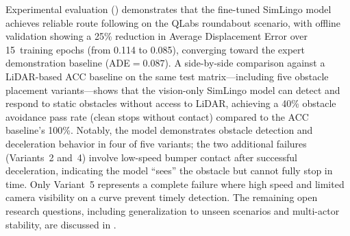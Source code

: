 Experimental evaluation () demonstrates that the fine-tuned SimLingo model achieves reliable route following on the QLabs roundabout scenario, with offline validation showing a 25\% reduction in Average Displacement Error over 15~training epochs (from 0.114 to 0.085), converging toward the expert demonstration baseline (ADE${=}0.087$). A side-by-side comparison against a LiDAR-based ACC baseline on the same test matrix---including five obstacle placement variants---shows that the vision-only SimLingo model can detect and respond to static obstacles without access to LiDAR, achieving a 40\% obstacle avoidance pass rate (clean stops without contact) compared to the ACC baseline's 100\%. Notably, the model demonstrates obstacle detection and deceleration behavior in four of five variants; the two additional failures (Variants~2 and~4) involve low-speed bumper contact after successful deceleration, indicating the model ``sees'' the obstacle but cannot fully stop in time. Only Variant~5 represents a complete failure where high speed and limited camera visibility on a curve prevent timely detection. The remaining open research questions, including generalization to unseen scenarios and multi-actor stability, are discussed in .
